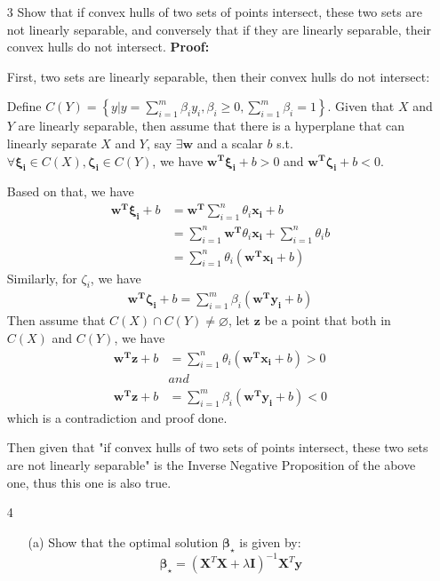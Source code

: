 \documentclass{article}
\renewcommand{\b}[1]{\bm{#1}}
\begin{document}
\begin{enumerate}
\begin{enumerate}
    \end{enumerate}
    \setlength\parindent{2em}
    \item[3] Show that if convex hulls of two sets of points intersect, these two sets are not linearly separable, and conversely that if they are linearly separable, their convex hulls do not intersect.\newline
    {\bf Proof:}\par
    First, two sets are linearly separable, then their convex hulls do not intersect:
    \par Define $C(Y)=\left\{y|y=\sum_{i=1}^m\beta_iy_i,\beta_i\geq 0,\sum_{i=1}^m\beta_i=1\right\}$. Given that $X$ and $Y$ are linearly separable, then assume that there is a hyperplane that can linearly separate $X$ and $Y$, say $\exists \b{w}$ and a scalar $b$ s.t. $\forall \b{\xi_i}\in C(X),\b{\zeta _i}\in C(Y)$, we have $\b{w^T\xi_i}+b>0$ and $\b{w^T\zeta_i}+b<0$.
    \par Based on that, we have
    \begin{align*}
        \b{w^T\xi_i}+b &= \b{w^T}\sum_{i=1}^n \theta_i\b{x_i} + b\\
        &= \sum_{i=1}^n \b{w^T}\theta_i\b{x_i}+\sum_{i=1}^n \theta_i b\\
        &= \sum_{i=1}^n \theta_i(\b{w^Tx_i}+b)
    \end{align*}
    Similarly, for $\zeta_i$, we have
    \begin{align*}
        \b{w^T\zeta_i}+b = \sum_{i=1}^m \beta_i(\b{w^Ty_i}+b)
    \end{align*}
    Then assume that $C(X)\cap C(Y)\neq \varnothing $, let $\b{z}$ be a point that both in $C(X)$ and $C(Y)$, we have 
    \begin{align*}
        \b{w^Tz}+b &= \sum_{i=1}^n \theta_i(\b{w^Tx_i}+b) > 0\\
        &and\\
        \b{w^Tz}+b &= \sum_{i=1}^m \beta_i(\b{w^Ty_i}+b) < 0
    \end{align*}
    which is a contradiction and proof done.
    \par Then given that "if convex hulls of two sets of points intersect, these two sets are not linearly separable" is the Inverse Negative Proposition of the above one, thus this one is also true.
    \item[4]
    \begin{enumerate}
    \setlength\parindent{2em}
        \item[(a)]Show that the optimal solution $\mathcal{\bm{\beta_\star}}$ is given by:\[\b{\beta_\star}=\left(\b{X}^T\b{X}+\lambda \b{I}\right)^{-1}\b{X}^T\b{y}\]\newline

\end{enumerate}
\end{enumerate}
\end{document}
